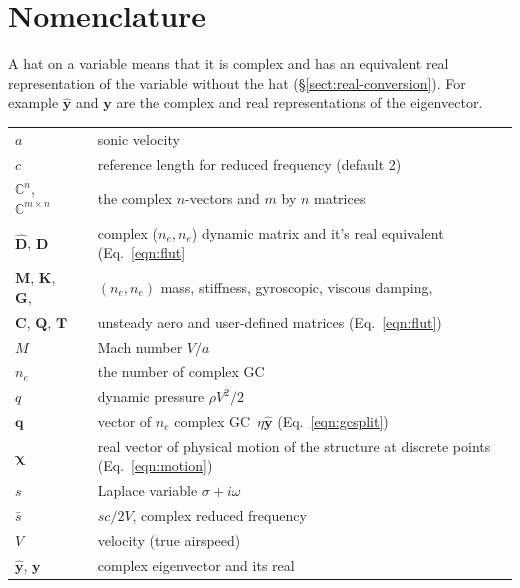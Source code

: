 \documentclass[10pt,openany,twoside]{book}
\numberwithin{equation}{section}   %
\newcommand{\Matrix}[1]{\boldsymbol{#1}}
\newcommand{\Vector}[1]{\boldsymbol{#1}}
\newcommand{\Gc}{GC}
\newcommand{\Sectref}[1]{\S\ref{#1}}
\newcommand{\Eqn}[1]{Eq.\ \ref{#1}}
\begin{document}
\section{Nomenclature}\label{sect:flut-nomenclature}
A hat on a variable means that it is complex and has an
equivalent real representation of the variable without the hat
(\Sectref{sect:real-conversion}).  For example $\hat{\Vector{y}}$ and
$\Vector{y}$ are the complex and real representations of the eigenvector.
\begin{small}
\noindent\begin{longtable}{@{}lcl@{}}
$a$ & & sonic velocity \\
$c$ & & reference length for reduced frequency (default 2)
	\index{=c@$c$ (ref. length)} \\
$\mathbb{C}^n$, $\mathbb{C}^{m \times n}$ & & the complex $n$-vectors
   and $m$ by $n$ matrices \\
$\hat{\Matrix{D}}$, $\Matrix{D}$ & & complex ($n_e,n_e$) dynamic matrix
	and it's real equivalent (\Eqn{eqn:flut} \\
$\Matrix{M}$, $\Matrix{K}$, $\Matrix{G}$,
	&  & $(n_e,n_e)$ mass, stiffness, gyroscopic, viscous damping, \\
$\Matrix{C}$, $\Matrix{Q}$, $\Matrix{T}$ & & unsteady aero and
   user-defined matrices (\Eqn{eqn:flut}) \\
$M$ & & Mach number $V/a$ \\
$n_e$ & & the number of complex \Gc \\
$q$ & & dynamic pressure $\rho V^2/2$ \\
$\Vector{q}$ & & vector of $n_e$ complex \Gc\ 
	$\eta\Vector{\hat{y}}$ (\Eqn{eqn:gcsplit}) \\
$\Vector{\chi}$ & & real vector of physical motion of the structure
	at discrete points (\Eqn{eqn:motion}) \\
$s$ & & Laplace variable $\sigma + i\omega$ \\
$\bar{s}$ & & $sc/2V$, complex reduced frequency \\
$V$ & & velocity (true airspeed) \\
$\Vector{\hat{y}}$, $\Vector{y}$ & & complex eigenvector and its real

\end{longtable}
\end{small}
\end{document}

